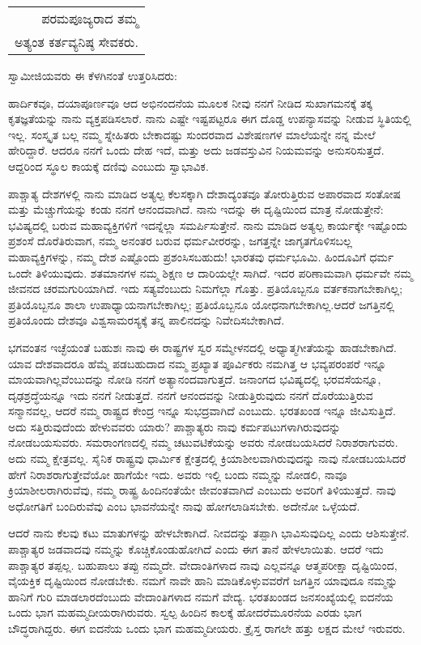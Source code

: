 \begin{longtable}[r]{@{}r@{}}
ಪರಮಪೂಜ್ಯರಾದ ತಮ್ಮ \\
ಅತ್ಯಂತ ಕರ್ತವ್ಯನಿಷ್ಠ ಸೇವಕರು. \\
\end{longtable}

\vskip 4pt

ಸ್ವಾಮೀಜಿಯವರು ಈ ಕೆಳಗಿನಂತೆ ಉತ್ತರಿಸಿದರು:

ಹಾರ್ದಿಕವೂ, ದಯಾಪೂರ್ಣವೂ ಆದ ಅಭಿನಂದನೆಯ ಮೂಲಕ ನೀವು ನನಗೆ ನೀಡಿದ ಸುಖಾಗಮನಕ್ಕೆ ತಕ್ಕ ಕೃತಜ್ಞತೆಯನ್ನು ನಾನು ವ್ಯಕ್ತಪಡಿಸಲಾರೆ. ನಾನು ಎಷ್ಟೇ ಇಷ್ಟಪಟ್ಟರೂ ಈಗ ದೊಡ್ಡ ಉಪನ್ಯಾಸವನ್ನು ನೀಡುವ ಸ್ಥಿತಿಯಲ್ಲಿ ಇಲ್ಲ. ಸಂಸ್ಕೃತ ಬಲ್ಲ ನಮ್ಮ ಸ್ನೇಹಿತರು ಬೇಕಾದಷ್ಟು ಸುಂದರವಾದ ವಿಶೇಷಣಗಳ ಮಾಲೆಯನ್ನೇ ನನ್ನ ಮೇಲೆ ಹೇರಿದ್ದಾರೆ. ಆದರೂ ನನಗೆ ಒಂದು ದೇಹ ಇದೆ, ಮತ್ತು ಅದು ಜಡವಸ್ತುವಿನ ನಿಯಮವನ್ನು ಅನುಸರಿಸುತ್ತದೆ. ಆದ್ದರಿಂದ ಸ್ಥೂಲ ಕಾಯಕ್ಕೆ ದಣಿವು ಎಂಬುದು ಸ್ವಾಭಾವಿಕ.

ಪಾಶ್ಚಾತ್ಯ ದೇಶಗಳಲ್ಲಿ ನಾನು ಮಾಡಿದ ಅತ್ಯಲ್ಪ ಕೆಲಸಕ್ಕಾಗಿ ದೇಶಾದ್ಯಂತವೂ ತೋರುತ್ತಿರುವ ಅಪಾರವಾದ ಸಂತೋಷ ಮತ್ತು ಮೆಚ್ಚುಗೆಯನ್ನು ಕಂಡು ನನಗೆ ಆನಂದವಾಗಿದೆ. ನಾನು ಇದನ್ನು ಈ ದೃಷ್ಟಿಯಿಂದ ಮಾತ್ರ ನೋಡುತ್ತೇನೆ: ಭವಿಷ್ಯದಲ್ಲಿ ಬರುವ ಮಹಾವ್ಯಕ್ತಿಗಳಿಗೆ ಇದನ್ನೆಲ್ಲಾ ಸಮರ್ಪಿಸುತ್ತೇನೆ. ನಾನು ಮಾಡಿದ ಅತ್ಯಲ್ಪ ಕಾರ್ಯಕ್ಕೇ ಇಷ್ಟೊಂದು ಪ್ರಶಂಸೆ ದೊರೆತಿರುವಾಗ, ನಮ್ಮ ಅನಂತರ ಬರುವ ಧರ್ಮವೀರರನ್ನು, ಜಗತ್ತನ್ನೇ ಜಾಗೃತಗೊಳಿಸಬಲ್ಲ ಮಹಾವ್ಯಕ್ತಿಗಳನ್ನು, ನಮ್ಮ ದೇಶ ಎಷ್ಟೊಂದು ಪ್ರಶಂಸಿಸಬಹುದು! ಭಾರತವು ಧರ್ಮಭೂಮಿ. ಹಿಂದೂವಿಗೆ ಧರ್ಮ ಒಂದೇ ತಿಳಿಯುವುದು. ಶತಮಾನಗಳ ನಮ್ಮ ಶಿಕ್ಷಣ ಆ ದಾರಿಯಲ್ಲೇ ಸಾಗಿದೆ. ಇದರ ಪರಿಣಾಮವಾಗಿ ಧರ್ಮವೇ ನಮ್ಮ ಜೀವನದ ಚರಮಗುರಿಯಾಗಿದೆ. ಇದು ಸತ್ಯವೆಂಬುದು ನಿಮಗೆಲ್ಲಾ ಗೊತ್ತು. ಪ್ರತಿಯೊಬ್ಬನೂ ವರ್ತಕನಾಗಬೇಕಾಗಿಲ್ಲ; ಪ್ರತಿಯೊಬ್ಬನೂ ಶಾಲಾ ಉಪಾಧ್ಯಾಯನಾಗಬೇಕಾಗಿಲ್ಲ; ಪ್ರತಿಯೊಬ್ಬನೂ ಯೋಧನಾಗಬೇಕಾಗಿಲ್ಲ.\break ಆದರೆ ಜಗತ್ತಿನಲ್ಲಿ ಪ್ರತಿಯೊಂದು ದೇಶವೂ ವಿಶ್ವಸಾಮರಸ್ಯಕ್ಕೆ ತನ್ನ ಪಾಲಿನದನ್ನು ನಿವೇದಿಸಬೇಕಾಗಿದೆ.

ಭಗವಂತನ ಇಚ್ಛೆಯಂತೆ ಬಹುಶಃ ನಾವು ಈ ರಾಷ್ಟ್ರಗಳ ಸ್ವರ ಸಮ್ಮೇಳನದಲ್ಲಿ ಅಧ್ಯಾತ್ಮಗೀತೆಯನ್ನು ಹಾಡಬೇಕಾಗಿದೆ. ಯಾವ ದೇಶವಾದರೂ ಹೆಮ್ಮೆ ಪಡಬಹುದಾದ ನಮ್ಮ ಪ್ರಖ್ಯಾತ ಪೂರ್ವಿಕರು ನಮಗಿತ್ತ ಆ ಭವ್ಯಪರಂಪರೆ ಇನ್ನೂ ಮಾಯವಾಗಿಲ್ಲವೆಂಬುದನ್ನು ನೋಡಿ ನನಗೆ ಅತ್ಯಾನಂದವಾಗುತ್ತದೆ. ಜನಾಂಗದ ಭವಿಷ್ಯದಲ್ಲಿ ಭರವಸೆಯನ್ನೂ, ದೃಢಶ್ರದ್ಧೆಯನ್ನೂ ಇದು ನನಗೆ ನೀಡುತ್ತದೆ. ನನಗೆ ಆನಂದವನ್ನು ನೀಡುತ್ತಿರುವುದು ನನಗೆ ದೊರೆಯುತ್ತಿರುವ ಸನ್ಮಾನವಲ್ಲ, ಆದರೆ ನಮ್ಮ ರಾಷ್ಟ್ರದ ಕೇಂದ್ರ ಇನ್ನೂ ಸುಭದ್ರವಾಗಿದೆ ಎಂಬುದು. ಭರತಖಂಡ ಇನ್ನೂ ಜೀವಿಸುತ್ತಿದೆ. ಅದು ಸತ್ತಿರುವುದೆಂದು ಹೇಳುವವರು ಯಾರು? ಪಾಶ್ಚಾತ್ಯರು ನಾವು ಕರ್ಮಪಟುಗಳಾಗಿರುವುದನ್ನು ನೋಡಬಯಸುವರು. ಸಮರಾಂಗಣದಲ್ಲಿ ನಮ್ಮ ಚಟುವಟಿಕೆಯನ್ನು ಅವರು ನೋಡಬಯಸಿದರೆ ನಿರಾಶರಾಗುವರು. ಅದು ನಮ್ಮ ಕ್ಷೇತ್ರವಲ್ಲ. ಸೈನಿಕ ರಾಷ್ಟ್ರವು ಧಾರ್ಮಿಕ ಕ್ಷೇತ್ರದಲ್ಲಿ ಕ್ರಿಯಾಶೀಲವಾಗಿರುವುದನ್ನು ನಾವು ನೋಡಬಯಸಿದರೆ ಹೇಗೆ ನಿರಾಶರಾಗುತ್ತೇವೆಯೋ ಹಾಗೆಯೇ ಇದು. ಅವರು ಇಲ್ಲಿ ಬಂದು ನಮ್ಮನ್ನು ನೋಡಲಿ, ನಾವೂ ಕ್ರಿಯಾಶೀಲರಾಗಿರುವೆವು, ನಮ್ಮ ರಾಷ್ಟ್ರ ಹಿಂದಿನಂತೆಯೇ ಜೀವಂತವಾಗಿದೆ ಎಂಬುದು ಅವರಿಗೆ ತಿಳಿಯುತ್ತದೆ. ನಾವು ಅಧೋಗತಿಗೆ ಬಂದಿರುವೆವು ಎಂಬ ಭಾವನೆಯನ್ನೇ ನಾವು ಹೋಗಲಾಡಿಸಬೇಕು. ಅದೇನೋ ಒಳ್ಳೆಯದೆ.

ಆದರೆ ನಾನು ಕೆಲವು ಕಟು ಮಾತುಗಳನ್ನು ಹೇಳಬೇಕಾಗಿದೆ. ನೀವದನ್ನು ತಪ್ಪಾಗಿ ಭಾವಿಸುವುದಿಲ್ಲ ಎಂದು ಆಶಿಸುತ್ತೇನೆ. ಪಾಶ್ಚಾತ್ಯರ ಜಡವಾದವು ನಮ್ಮನ್ನು ಕೊಚ್ಚಿಕೊಂಡುಹೋಗಿದೆ ಎಂದು ಈಗ ತಾನೆ ಹೇಳಲಾಯಿತು. ಆದರೆ ಇದು ಪಾಶ್ಚಾತ್ಯರ ತಪ್ಪಲ್ಲ. ಬಹುಪಾಲು ತಪ್ಪು ನಮ್ಮದೇ. ವೇದಾಂತಿಗಳಾದ ನಾವು ಎಲ್ಲವನ್ನೂ ಆತ್ಮಪರೀಕ್ಷಾ ದೃಷ್ಟಿಯಿಂದ, ವೈಯಕ್ತಿಕ ದೃಷ್ಟಿಯಿಂದ ನೋಡಬೇಕು. ನಮಗೆ ನಾವೇ ಹಾನಿ ಮಾಡಿಕೊಳ್ಳುವವರೆಗೆ ಜಗತ್ತಿನ ಯಾವುದೂ ನಮ್ಮನ್ನು ಹಾನಿಗೆ ಗುರಿ ಮಾಡಲಾರದೆಂಬುದು ವೇದಾಂತಿಗಳಾದ ನಮಗೆ ವೇದ್ಯ. ಭರತಖಂಡದ ಜನಸಂಖ್ಯೆಯಲ್ಲಿ ಐದನೆಯ ಒಂದು ಭಾಗ ಮಹಮ್ಮದೀಯ\-ರಾಗಿರುವರು. ಸ್ವಲ್ಪ ಹಿಂದಿನ ಕಾಲಕ್ಕೆ ಹೋದರೆ\break ಮೂರನೆಯ ಎರಡು ಭಾಗ ಬೌದ್ಧರಾಗಿದ್ದರು. ಈಗ ಐದನೆಯ ಒಂದು ಭಾಗ ಮಹಮ್ಮದೀ\-ಯರು. ಕ್ರೈಸ್ತ ರಾಗಲೇ ಹತ್ತು ಲಕ್ಷದ ಮೇಲೆ ಇರುವರು.

